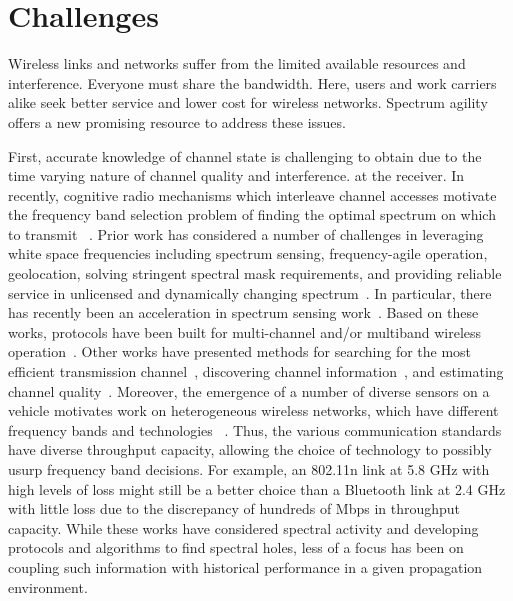 \section{Challenges}

Wireless links and networks suffer from the limited available resources
and interference. Everyone must 
share the bandwidth. Here, users and work carriers alike seek 
better service and lower cost for wireless networks. 
Spectrum agility offers a new promising resource to address these issues. 

First, accurate knowledge of channel state is challenging to obtain due to the
time varying nature of channel quality and interference.
at the receiver. In recently, cognitive radio mechanisms which 
interleave channel accesses motivate the frequency band selection 
problem of finding the optimal spectrum on which to transmit
~\cite{ghasemi2008spectrum}. Prior work has considered a number of 
challenges in leveraging white space frequencies including spectrum 
sensing, frequency-agile operation, geolocation, solving stringent 
spectral mask requirements, and providing reliable service in unlicensed 
and dynamically changing spectrum~\cite{shellhammer2009technical}. In 
particular, there has recently been an acceleration in spectrum sensing 
work~\cite{rayanchu2011fluid, kim1996pulse,cabric2004implementation}. 
Based on these works, protocols have been built for multi-channel and/or 
multiband wireless operation~\cite{MOAR,raychaudhuri2003spectrum,sabharwal2007opportunistic}. 
Other works have presented methods for searching for the most efficient 
transmission channel~\cite{mo2005comparison}, discovering channel 
information~\cite{rayanchu2011fluid, sabharwal2007opportunistic}, and 
estimating channel quality~\cite{MOAR}. Moreover, the emergence of a 
number of diverse sensors on a vehicle motivates work on heterogeneous 
wireless networks, which have different frequency bands and technologies
~\cite{hossain2010vehicular}. Thus, the various communication standards 
have diverse throughput capacity, allowing the choice of technology 
to possibly usurp frequency band decisions. For example, an 802.11n 
link at 5.8 GHz with high levels of loss might still be a better choice 
than a Bluetooth link at 2.4 GHz with little loss due to the discrepancy 
of hundreds of Mbps in throughput capacity. While these works have 
considered spectral activity and developing protocols and algorithms to 
find spectral holes, less of a focus has been on coupling such information 
with historical performance in a given propagation environment.

